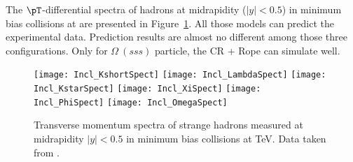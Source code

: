 \documentclass[ALICE,manyauthors]{StrinJet}
\begin{document}
The $\pT$-differential spectra of hadrons at midrapidity ($|y| < 0.5$) in minimum bias \pp collisions at \seven are presented in Figure~\ref{fig:InclParSpect}. All those models can predict the experimental data. Prediction results are almost no different among those three configurations. Only for $\Omega~(sss)$ particle, the CR + Rope can simulate well.
\begin{figure}[ht]
	\begin{center}
		\texttt{[image: Incl\_KshortSpect]}
		\texttt{[image: Incl\_LambdaSpect]}
		\texttt{[image: Incl\_KstarSpect]}
		\texttt{[image: Incl\_XiSpect]}
		\texttt{[image: Incl\_PhiSpect]}
		\texttt{[image: Incl\_OmegaSpect]}
	\end{center}
	\caption{Transverse momentum spectra of strange hadrons measured at midrapidity $|y| < 0.5$ in minimum bias \pp collisions at \seven TeV. Data taken from \cite{ALICE:2020jsh, Basak:2012jy, ALICE:2019hyb}.}
	\label{fig:InclParSpect}
\end{figure}

\end{document}
